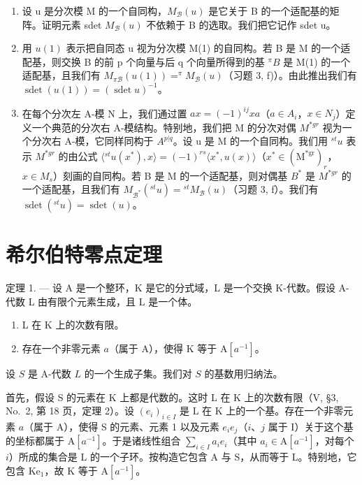 \begin{enumerate}
\def\labelenumi{\alph{enumi})}
\item
  设 u 是分次模 M 的一个自同构，\(M_{\mathcal{B}}(u)\) 是它关于 B 的一个适配基的矩阵。证明元素 sdet \(M_{\mathcal{B}}(u)\) 不依赖于 B 的选取。我们把它记作 sdet u。
\item
  用 \(u(1)\) 表示把自同态 u 视为分次模 M(1) 的自同构。若 B 是 M 的一个适配基，则交换 B 的前 p 个向量与后 q 个向量所得到的基 \(^{\pi}B\) 是 M(1) 的一个适配基，且我们有 \(M_{\pi\mathcal{B}}(u(1)) = ^{\pi}M_{\mathcal{B}}(u)\)（习题 3, f)）。由此推出我们有 \(\operatorname{sdet}(u(1)) = (\operatorname{sdet} u)^{-1}\)。
\item
  在每个分次左 A-模 N 上，我们通过置 \(ax = (-1)^{ij}xa\)（\(a \in A_i\)，\(x \in N_j\)）定义一个典范的分次右 A-模结构。特别地，我们把 M 的分次对偶 \(M^{*gr}\) 视为一个分次右 A-模，它同样同构于 \(A^{p|q}\)。设 u 是 M 的一个自同构。我们用 \({}^{st}u\) 表示 \(M^{*gr}\) 的由公式 \(\langle{}^{st}u(x^{*}), x\rangle = (-1)^{rs}\langle x^{*}, u(x)\rangle\)（\(x^{*} \in (\mathrm{M}^{*\mathrm{gr}})_r\)，\(x \in M_s\)）刻画的自同构。若 B 是 M 的一个适配基，则对偶基 \(B^*\) 是 \(M^{*gr}\) 的一个适配基，且我们有 \(M_{\mathcal{B}^*}({}^{st}u) = {}^{st}M_{\mathcal{B}}(u)\)（习题 3, f）。我们有 \(\operatorname{sdet}({}^{st}u) = \operatorname{sdet}(u)\)。
\end{enumerate}

\chapter{希尔伯特零点定理}

定理 1. --- 设 A 是一个整环，K 是它的分式域，L 是一个交换 K-代数。假设 A-代数 L 由有限个元素生成，且 L 是一个体。

\begin{enumerate}
\def\labelenumi{\alph{enumi})}
\item
  L 在 K 上的次数有限。
\item
  存在一个非零元素 \(a\)（属于 \(\mathrm{A}\)），使得 \(\mathrm{K}\) 等于 \(\mathrm{A}[a^{-1}]\)。
\end{enumerate}

设 \(S\) 是 A-代数 \(L\) 的一个生成子集。我们对 \(S\) 的基数用归纳法。

首先，假设 S 的元素在 K 上都是代数的。这时 L 在 K 上的次数有限（V, §3, No.~2, 第 18 页，定理 2）。设 \((e_i)_{i\in I}\) 是 L 在 K 上的一个基。存在一个非零元素 \(a\)（属于 A），使得 S 的元素、元素 1 以及元素 \(e_i e_j\)（\(i\)、\(j\) 属于 I）关于这个基的坐标都属于 \(\mathrm{A}[a^{-1}]\)。于是诸线性组合 \(\sum_{i\in I}a_i e_i\)（其中 \(a_i\in \mathrm{A}[a^{-1}]\)，对每个 \(i\)）所成的集合是 L 的一个子环。按构造它包含 A 与 S，从而等于 L。特别地，它包含 \(\mathrm{Ke}_1\)，故 K 等于 \(\mathrm{A}[a^{-1}]\)。

